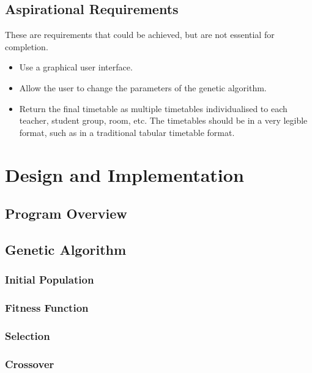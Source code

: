 \documentclass[a4paper, 12pt]{report}
\begin{document}
\section{Aspirational Requirements}

These are requirements that could be achieved, but are not essential for
completion.
\begin{itemize}
	\item Use a graphical user interface.
	\item Allow the user to change the parameters of the genetic algorithm.
	\item Return the final timetable as multiple timetables individualised to
		each teacher, student group, room, etc. The timetables should be in a
		very legible format, such as in a traditional tabular timetable format.
\end{itemize}

\chapter{Design and Implementation}  %

\section{Program Overview}  %

\section{Genetic Algorithm}  %

\subsection{Initial Population}  %

\subsection{Fitness Function}  %

\subsection{Selection}  %

\subsection{Crossover}  %
\end{document}
